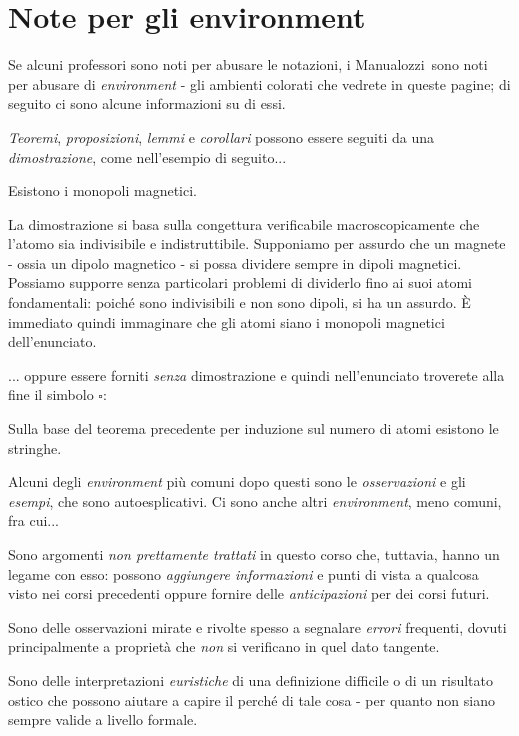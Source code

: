 \section*{Note per gli environment}
Se alcuni professori sono noti per abusare le notazioni, i Manualozzi\texttrademark\ sono noti per abusare di \textit{environment} - gli ambienti colorati che vedrete in queste pagine; di seguito ci sono alcune informazioni su di essi.

\noindent\textit{Teoremi}, \textit{proposizioni}, \textit{lemmi} e \textit{corollari} possono essere seguiti da una \textit{dimostrazione}, come nell'esempio di seguito...
\begin{theoremanote}
	Esistono i monopoli magnetici.
\end{theoremanote}
\begin{demonstration}
	La dimostrazione si basa sulla congettura verificabile macroscopicamente che l'atomo sia indivisibile e indistruttibile. Supponiamo per assurdo che un magnete - ossia un dipolo magnetico - si possa dividere sempre in dipoli magnetici. Possiamo supporre senza particolari problemi di dividerlo fino ai suoi atomi fondamentali: poiché sono indivisibili e non sono dipoli, si ha un assurdo. È immediato quindi immaginare che gli atomi siano i monopoli magnetici dell'enunciato.
\end{demonstration}
... oppure essere forniti \textit{senza} dimostrazione e quindi nell'enunciato troverete alla fine il simbolo $\square$:
\begin{corollarynote}
	Sulla base del teorema precedente per induzione sul numero di atomi esistono le stringhe.
\end{corollarynote}
\noindent Alcuni degli \textit{environment} più comuni dopo questi sono le \textit{osservazioni} e gli \textit{esempi}, che sono autoesplicativi. Ci sono anche altri \textit{environment}, meno comuni, fra cui...
\begin{digression}
	Sono argomenti \textit{non prettamente trattati} in questo corso che, tuttavia, hanno un legame con esso: possono \textit{aggiungere informazioni} e punti di vista a qualcosa visto nei corsi precedenti oppure fornire delle \textit{anticipazioni} per dei corsi futuri.
\end{digression}
\begin{attention}
	Sono delle osservazioni mirate e rivolte spesso a segnalare \textit{errori} frequenti, dovuti principalmente a proprietà che \textit{non} si verificano in quel dato tangente. 
\end{attention}
\begin{intuit}
	Sono delle interpretazioni \textit{euristiche} di una definizione difficile o di un risultato ostico che possono aiutare a capire il perché di tale cosa - per quanto non siano sempre valide a livello formale. 
\end{intuit}
